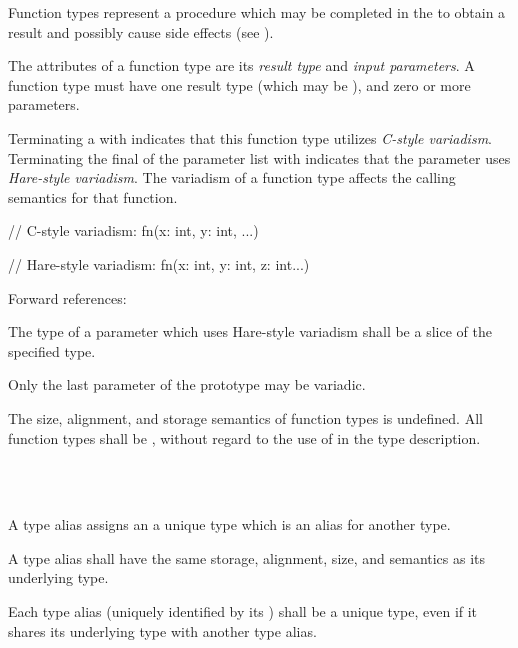 \specsubsubitem
Function types represent a procedure which may be completed in the
 to obtain a result and possibly cause side
effects (see ).

\specsubsubitem
The attributes of a function type are its \textit{result type} and
\textit{input parameters}. A function type must have one result type (which may
be ), and zero or more parameters.

\specsubsubitem
Terminating a  with  indicates that
this function type utilizes \textit{C-style variadism}. Terminating the final
 of the parameter list with  indicates
that the parameter uses \textit{Hare-style variadism}. The variadism of a
function type affects the calling semantics for that function.

\begin{codesample}
// C-style variadism:
fn(x: int, y: int, ...)

// Hare-style variadism:
fn(x: int, y: int, z: int...)
\end{codesample}

Forward references: 

\specsubsubitem
The type of a parameter which uses Hare-style variadism shall be a
 slice of the specified type.


\specsubsubitem
Only the last parameter of the prototype may be variadic.

\specsubsubitem
The size, alignment, and storage semantics of function types is undefined. All
function types shall be , without regard to the use of
 in the type description.


\begin{grammar}
 \\
	 \\
\end{grammar}

\specsubsubitem
A type alias assigns an  a unique type which is an
alias for another type.


\specsubsubitem
A type alias shall have the same storage, alignment, size, and semantics as its
underlying type.

\specsubsubitem
Each type alias (uniquely identified by its ) shall be
a unique type, even if it shares its underlying type with another type alias.

